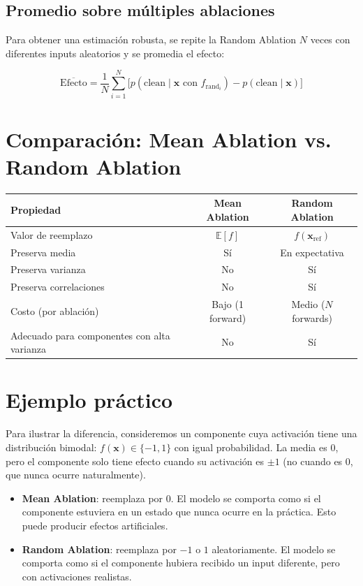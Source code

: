 \documentclass[11pt,a4paper]{report}
\theoremstyle{definition}
\begin{document}
\subsection{Promedio sobre múltiples ablaciones}

Para obtener una estimación robusta, se repite la Random Ablation $N$ veces con diferentes inputs aleatorios y se promedia el efecto:

\[
\overline{\text{Efecto}} = \frac{1}{N} \sum_{i=1}^N \big[p(\text{clean} \mid \mathbf{x} \text{ con } f_{\text{rand}_i}) - p(\text{clean} \mid \mathbf{x})\big]
\]

\section{Comparación: Mean Ablation vs. Random Ablation}

\begin{center}
\begin{tabular}{lcc}
\toprule
\textbf{Propiedad} & \textbf{Mean Ablation} & \textbf{Random Ablation} \\
\midrule
Valor de reemplazo & $\mathbb{E}[f]$ & $f(\mathbf{x}_{\text{ref}})$ \\
Preserva media & Sí & En expectativa \\
Preserva varianza & No & Sí \\
Preserva correlaciones & No & Sí \\
Costo (por ablación) & Bajo (1 forward) & Medio ($N$ forwards) \\
Adecuado para componentes con alta varianza & No & Sí \\
\bottomrule
\end{tabular}
\end{center}

\section{Ejemplo práctico}

Para ilustrar la diferencia, consideremos un componente cuya activación tiene una distribución bimodal: $f(\mathbf{x}) \in \{-1, 1\}$ con igual probabilidad. La media es 0, pero el componente solo tiene efecto cuando su activación es $\pm 1$ (no cuando es 0, que nunca ocurre naturalmente).

\begin{itemize}
    \item \textbf{Mean Ablation}: reemplaza por 0. El modelo se comporta como si el componente estuviera en un estado que nunca ocurre en la práctica. Esto puede producir efectos artificiales.
    \item \textbf{Random Ablation}: reemplaza por $-1$ o $1$ aleatoriamente. El modelo se comporta como si el componente hubiera recibido un input diferente, pero con activaciones realistas.
\end{itemize}
\end{document}

